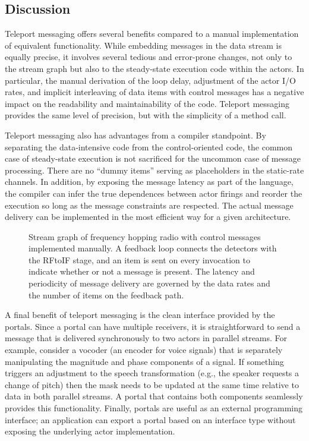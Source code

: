 \documentclass{sig-alternate}
\begin{document}
\subsection{Discussion}

Teleport messaging offers several benefits compared to a manual
implementation of equivalent functionality.  While embedding messages
in the data stream is equally precise, it involves several tedious
and error-prone changes, not only to the stream graph but also to the
steady-state execution code within the actors.  In particular, the
manual derivation of the loop delay, adjustment of the actor I/O
rates, and implicit interleaving of data items with control messages
has a negative impact on the readability and maintainability of the
code.  Teleport messaging provides the same level of precision, but
with the simplicity of a method call.

Teleport messaging also has advantages from a compiler standpoint.  By
separating the data-intensive code from the control-oriented code, the
common case of steady-state execution is not sacrificed for
the uncommon case of message processing.  There are no ``dummy items''
serving as placeholders in the static-rate channels.  In addition, by
exposing the message latency as part of the language, the compiler can
infer the true dependences between actor firings and reorder the
execution so long as the message constraints are respected.  The
actual message delivery can be implemented in the most efficient way
for a given architecture.

\begin{figure}[t]
\centering
\vspace{-12pt}
\vspace{-10pt}
\caption{\small Stream graph of frequency hopping radio with control
messages implemented manually.  A feedback loop connects the detectors
with the RFtoIF stage, and an item is sent on every invocation to
indicate whether or not a message is present.  The latency and
periodicity of message delivery are governed by the data rates and the
number of items on the feedback
path. \protect\label{fig:fhr-manual}}
\vspace{-12pt}
\end{figure}

A final benefit of teleport messaging is the clean interface provided
by the portals.  Since a portal can have multiple receivers, it is
straightforward to send a message that is delivered synchronously to
two actors in parallel streams.  For example, consider a vocoder (an
encoder for voice signals) that is separately manipulating the
magnitude and phase components of a signal.  If something triggers an
adjustment to the speech transformation (e.g., the speaker
requests a change of pitch) then the mask needs to be updated at the
same time relative to data in both parallel streams.  A portal that
contains both components seamlessly provides this functionality.
Finally, portals are useful as an external programming interface; an
application can export a portal based on an interface type without
exposing the underlying actor implementation.
\end{document}
